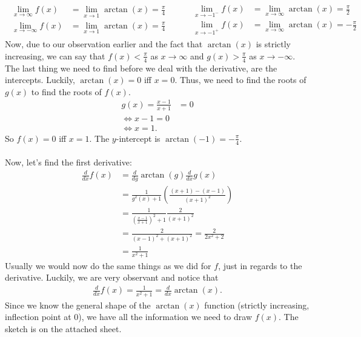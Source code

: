 \documentclass{article}
\begin{document}
\begin{align*}
  \begin{aligned}
    \lim_{x\to\infty}f(x)  & = \lim_{x\to 1}\arctan(x)=\frac{\pi}{4} \\
    \lim_{x\to-\infty}f(x) & = \lim_{x\to 1}\arctan(x)=\frac{\pi}{4}
  \end{aligned}
  \hspace{1cm}
  \begin{aligned}
    \lim_{x\to-1^-}f(x) & = \lim_{x\to\infty}\arctan(x)= \frac{\pi}{2} \\
    \lim_{x\to-1^+}f(x) & = \lim_{x\to\infty}\arctan(x)=-\frac{\pi}{2}
  \end{aligned}
\end{align*}
Now, due to our observation earlier and the fact that $\arctan(x)$ is strictly increasing, we can say that $f(x)<\frac{\pi}{4}$ as $x\to\infty$ and $g(x)>\frac{\pi}{4}$ as $x\to -\infty$.\\
The last thing we need to find before we deal with the derivative, are the intercepts. Luckily, $\arctan(x)=0$ iff $x=0$. Thus, we need to find the roots of $g(x)$ to find the roots of $f(x)$.
\begin{align*}
  g(x)=\frac{x-1}{x+1} & =0 \\
  \Leftrightarrow x-1 = 0   \\
  \Leftrightarrow x = 1.
\end{align*}
So $f(x)=0$ iff $x=1$. The $y$-intercept is $\arctan(-1)=-\frac{\pi}{4}$.\\\\
Now, let's find the first derivative:
\begin{align*}
  \frac{d}{dx}f(x) & =\frac{d}{dg}\arctan(g)\frac{d}{dx}g(x)                      \\
                   & =\frac{1}{g^2(x)+1}\left(\frac{(x+1)-(x-1)}{(x+1)^2}\right)  \\
                   & =\frac{1}{\left(\frac{x-1}{x+1}\right)^2+1}\frac{2}{(x+1)^2} \\
                   & =\frac{2}{(x-1)^2+(x+1)^2} = \frac{2}{2x^2+2}                \\
                   & =\frac{1}{x^2+1}
\end{align*}
Usually we would now do the same things as we did for $f$, just in regards to the derivative. Luckily, we are very observant and notice that
\begin{align*}
  \frac{d}{dx}f(x)=\frac{1}{x^2+1}=\frac{d}{dx}\arctan(x).
\end{align*}
Since we know the general shape of the $\arctan(x)$ function (strictly increasing, inflection point at $0$), we have all the information we need to draw $f(x)$. The sketch is on the attached sheet.
\end{document}
